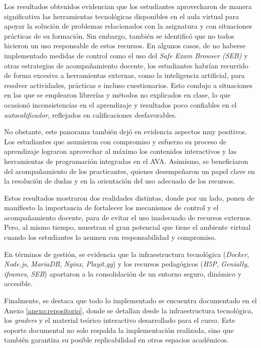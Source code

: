 \documentclass[letter,oneside,12pt,spanish]{report}
\begin{document}
Los resultados obtenidos evidencian que los estudiantes aprovecharon de manera significativa las herramientas tecnológicas disponibles en el aula virtual para apoyar la solución de problemas relacionados con la asignatura y con situaciones prácticas de su formación. Sin embargo, también se identificó que no todos hicieron un uso responsable de estos recursos. En algunos casos, de no haberse implementado medidas de control como el uso del \textit{Safe Exam Browser (SEB)} y otras estrategias de acompañamiento docente, los estudiantes habrían recurrido de forma excesiva a herramientas externas, como la inteligencia artificial, para resolver actividades, prácticas e incluso cuestionarios. Esto condujo a situaciones en las que se emplearon librerías y métodos no explicados en clase, lo que ocasionó inconsistencias en el aprendizaje y resultados poco confiables en el \textit{autocalificador}, reflejados en calificaciones desfavorables.

No obstante, este panorama también dejó en evidencia aspectos muy positivos. Los estudiantes que asumieron con compromiso y esfuerzo su proceso de aprendizaje lograron aprovechar al máximo los contenidos interactivos y las herramientas de programación integradas en el AVA. Asimismo, se beneficiaron del acompañamiento de los practicantes, quienes desempeñaron un papel clave en la resolución de dudas y en la orientación del uso adecuado de los recursos.

Estos resultados mostraron dos realidades distintas, donde por un lado, ponen de manifiesto la importancia de fortalecer los mecanismos de control y el acompañamiento docente, para de evitar el uso inadecuado de recursos externos. Pero, al mismo tiempo, muestran el gran potencial que tiene el ambiente virtual cuando los estudiantes lo asumen con responsabilidad y compromiso.

En términos de gestión, se evidencia que la infraestructura tecnológica (\textit{Docker}, \textit{Node.js}, \textit{MariaDB}, \textit{Nginx}, \textit{Playit.gg}) y los recursos pedagógicos (\textit{H5P}, \textit{Genially}, \textit{iframes}, \textit{SEB}) aportaron a la consolidación de un entorno seguro, dinámico y accesible.

Finalmente, se destaca que todo lo implementado se encuentra documentado en el Anexo \ref{anexo:repositorio}, donde se detallan desde la infraestructura tecnológica, los \textit{graders} y el material teórico interactivo desarrollado para el curso. Este soporte documental no solo respalda la implementación realizada, sino que también garantiza su posible replicabilidad en otros espacios académicos.
\end{document}
